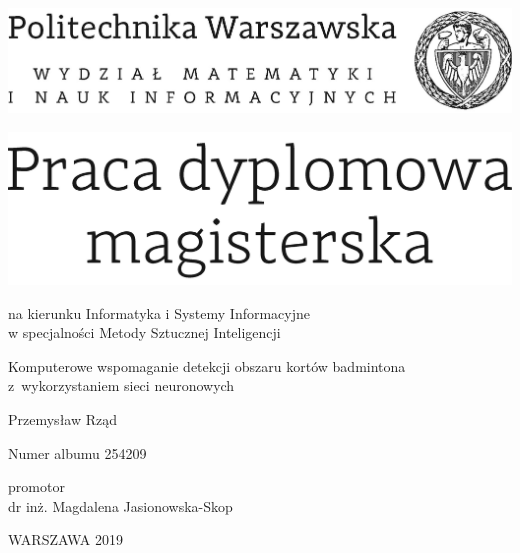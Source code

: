 \documentclass[12pt,twoside,a4paper]{article}
\newcommand{\discipline}{Informatyka i Systemy Informacyjne}
\newcommand{\spec}{Metody Sztucznej Inteligencji} %
\renewcommand{\title}{Komputerowe wspomaganie detekcji obszaru kortów badmintona z~wykorzystaniem sieci neuronowych}
\renewcommand{\author}{Przemysław Rząd}
\newcommand{\album}{254209}
\newcommand{\supervisor}{dr inż. Magdalena Jasionowska-Skop}
\renewcommand{\year}{2019}
\begin{document}
\pagestyle{empty}

\begin{center}
\includegraphics[scale=1.]{img/politechnika} 
\vspace{70pt}


\includegraphics[scale=1.]{img/praca_mgr} %

{ \arial na kierunku \discipline
\\ w specjalności \spec %

\vspace{40pt}
{\arial \large \title}

\vspace{50pt}

{\arial \huge \author}

\vspace{5pt}

Numer albumu \album

\vspace{40pt}

promotor \\
{\arial \supervisor}

\vspace{15pt}
 

 \vfill
WARSZAWA \year \\
}
\end{center}
\end{document}
